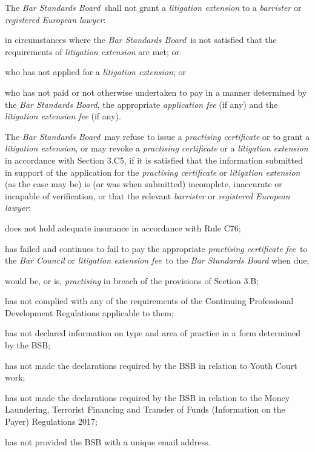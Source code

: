 The \emph{Bar Standards Board}~shall not grant a \emph{litigation
extension} to a \emph{barrister} or \emph{registered European lawyer}:\nl\item in circumstances where the \emph{Bar Standards Board}~is not
satisfied that the requirements of \emph{litigation extension} are met;
or
\item who has not applied for a \emph{litigation extension}; or
\item who has not paid or not otherwise undertaken to pay in a manner
determined by the \emph{Bar Standards Board}, the appropriate
\emph{application fee} (if any) and the \emph{litigation extension fee}
(if any).
\ln
{}

The \emph{Bar Standards Board}~may refuse to issue a \emph{practising
certificate} or to grant a \emph{litigation extension}, or may revoke a
\emph{practising certificate} or a \emph{litigation extension} in
accordance with Section 3.C5, if it is satisfied that the information
submitted in support of the application for the \emph{practising
certificate} or \emph{litigation extension} (as the case may be) is (or
was when submitted) incomplete, inaccurate or incapable of verification,
or that the relevant \emph{barrister} or \emph{registered European
lawyer}:\nl\item does not hold adequate insurance in accordance with Rule C76;
\item has failed and continues to fail to pay the appropriate
\emph{practising certificate fee}~to the \emph{Bar Council} or
\emph{litigation extension fee}~to the \emph{Bar Standards Board} when
due;
\item would be, or is, \emph{practising} in breach of the provisions of
Section 3.B;
\item has not complied with any of the requirements of the Continuing
Professional Development Regulations applicable to them;
\item has not declared information on type and area of practice in a form
determined by the BSB;
\item has not made the declarations required by the BSB in relation to
Youth Court work;
\item has not made the declarations required by the BSB in relation to the
Money Laundering, Terrorist Financing and Transfer of Funds (Information
on the Payer) Regulations 2017;
\item has not provided the BSB with a unique email address.
\ln
{}

